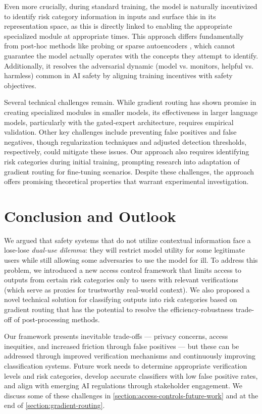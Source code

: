 \documentclass{article}
\theoremstyle{plain}
\theoremstyle{definition}
\theoremstyle{remark}
\begin{document}
Even more crucially, during standard training, the model is naturally
incentivized to identify risk category information in inputs and
surface this in its representation space, as this is directly linked
to enabling the appropriate specialized module at appropriate times.
This approach differs fundamentally from post-hoc methods like
probing or sparse autoencoders
\cite{cunningham2023sparseautoencodershighlyinterpretable}, which
cannot guarantee the model actually operates with the concepts they
attempt to identify.
Additionally, it resolves the adversarial dynamic (model vs.
monitors, helpful vs. harmless) common in AI safety by aligning
training incentives with safety objectives.

Several technical challenges remain. While gradient routing has shown
promise in creating specialized modules in smaller models, its
effectiveness in larger language models, particularly with the
gated-expert architecture, requires empirical validation. Other key
challenges include preventing false positives and false negatives,
though regularization techniques and adjusted detection thresholds,
respectively, could mitigate these issues. Our approach also requires
identifying risk categories during initial training, prompting
research into adaptation of gradient routing for fine-tuning
scenarios. Despite these challenges, the approach offers promising
theoretical properties that warrant experimental investigation.

\section{Conclusion and Outlook}

We argued that safety systems that do not utilize contextual
information face a lose-lose \emph{dual-use dilemma}: they will
restrict model utility for some legitimate users while still allowing
some adversaries to use the model for ill. To address this problem,
we introduced a new access control framework that limits access to
outputs from certain risk categories only to users with relevant
verifications (which serve as proxies for trustworthy real-world
context). We also proposed a novel technical solution for classifying
outputs into risk categories based on gradient routing that has the
potential to resolve the efficiency-robustness trade-off of
post-processing methods.

Our framework presents inevitable trade-offs --- privacy concerns,
access inequities, and increased friction through false positives ---
but these can be addressed through improved verification mechanisms
and continuously improving classification systems. Future work needs
to determine appropriate verification levels and risk categories,
develop accurate classifiers with low false positive rates, and align
with emerging AI regulations through stakeholder engagement. We
discuss some of these challenges in
\cref{section:access-controls-future-work} and at the end of
\cref{section:gradient-routing}.
\end{document}
